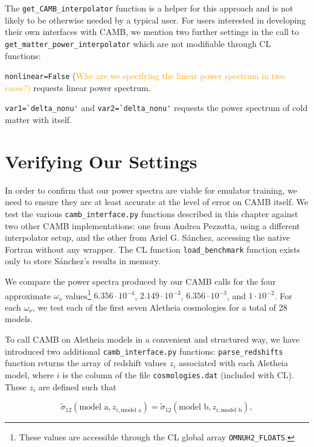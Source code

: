 The \verb|get_CAMB_interpolator| function is a helper for this approach and is 
not 
likely to be otherwise needed by a typical user. For users interested in
developing their own interfaces with CAMB, we mention two further
settings in the call to \\
\verb|get_matter_power_interpolator| which are not
modifiable through CL functions:

\verb|nonlinear=False| (\textcolor{orange}{Why are we specifying the linear
power spectrum in two cases?)} \quad requests linear power spectrum.

\verb|var1=`delta_nonu'| and \verb|var2=`delta_nonu'| requests the power
spectrum of cold matter with itself.


\section{Verifying Our Settings}
\label{sec: CAMB_validation}

In order to confirm that our power spectra are viable for emulator training,
we need to ensure they are at least accurate at the level of error on CAMB
itself. We test the various \verb|camb_interface.py| functions described in
this chapter against two other CAMB implementations: one from Andrea Pezzotta,
using a different interpolator setup, and the other from Ariel G. S\'{a}nchez,
accessing the native Fortran without any wrapper. The CL function
\verb|load_benchmark| function exists only to store S\'{a}nchez's results in
memory.

We compare the power spectra produced by our CAMB calls for the four
approximate $\omega_\nu$ values\footnote{These values are
accessible through the CL global array \verb|OMNUH2_FLOATS|.}
$6.356 \cdot 10^{-4}$, $2.149 \cdot 10^{-3}$,
$6.356 \cdot 10^{-3}$, and $1 \cdot 10^{-2}$. For each
$\omega_\nu$, we test each of the first seven Aletheia cosmologies for 
a total of 28 models.

To call CAMB on Aletheia models in a convenient and structured way, we have
introduced two additional \verb|camb_interface.py| functions:
\verb|parse_redshifts| function returns the array of redshift values $z_i$
associated with each Aletheia model, where $i$ is the column of the file
\verb|cosmologies.dat| (included with CL). These $z_i$ are defined such that

\begin{equation}
\tilde{\sigma}_{12}(\text{model a}, z_{i, \text{model a}})
=
\tilde{\sigma}_{12}(\text{model b}, z_{i, \text{model b}})
,\end{equation}


